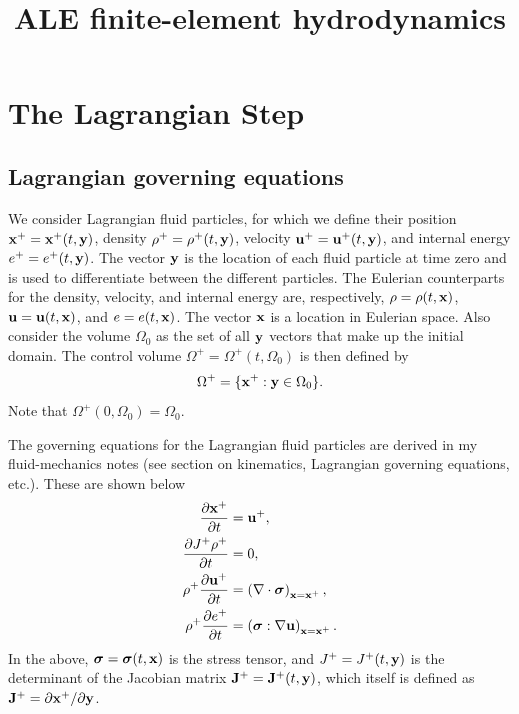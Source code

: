 \documentclass[11pt]{report}
\title{ALE finite-element hydrodynamics}
\begin{document}
\maketitle

\chapter{The Lagrangian Step}
\section{Lagrangian governing equations}
We consider Lagrangian fluid particles, for which we define their position $\mathbf{x}^+=\mathbf{x}^+(t,\mathbf{y})$, density $\rho^+ = \rho^+(t,\mathbf{y})$, velocity $\mathbf{u}^+ = \mathbf{u}^+(t,\mathbf{y})$, and internal energy $e^+ = e^+(t,\mathbf{y})$. The vector $\mathbf{y}$ is the location of each fluid particle at time zero and is used to differentiate between the different particles. The Eulerian counterparts for the density, velocity, and internal energy are, respectively, $\rho = \rho(t,\mathbf{x})$, $\mathbf{u} = \mathbf{u}(t,\mathbf{x})$, and $e = e(t,\mathbf{x})$. The vector $\mathbf{x}$ is a location in Eulerian space. Also consider the volume $\Omega_0$ as the set of all $\mathbf{y}$ vectors that make up the initial domain. The control volume $\Omega^+ = \Omega^+(t, \Omega_0)$ is then defined by
\begin{equation}
    \Omega^+ = \{ \mathbf{x}^+:\mathbf{y} \in \Omega_0 \}.
\end{equation}
Note that $\Omega^+(0,\Omega_0) = \Omega_0$.

The governing equations for the Lagrangian fluid particles are derived in my fluid-mechanics notes (see section on kinematics, Lagrangian governing equations, etc.). These are shown below
\begin{align}
    \frac{\partial \mathbf{x}^+}{\partial t} &= \mathbf{u}^+, \label{eq:lag_gov_evol_x} \\
    \frac{\partial J^+ \rho^+}{\partial t} &= 0, \label{eq:lag_gov_evol_rho} \\
    \rho^+ \frac{\partial \mathbf{u}^+}{\partial t} &= \left ( \nabla \cdot \bm \sigma \right )_{\mathbf{x} = \mathbf{x}^+}, \label{eq:lag_gov_evol_u} \\
    \rho^+ \frac{\partial e^+}{\partial t} &= \left ( \bm \sigma : \nabla \mathbf{u} \right )_{\mathbf{x} = \mathbf{x}^+}. \label{eq:lag_gov_evol_e}
\end{align}
In the above, $\bm \sigma = \bm \sigma(t,\mathbf{x})$ is the stress tensor, and $J^+ = J^+(t,\mathbf{y})$ is the determinant of the Jacobian matrix $\mathbf{J}^+ = \mathbf{J}^+(t,\mathbf{y})$, which itself is defined as $\mathbf{J}^+ =  \partial \mathbf{x}^+ / \partial \mathbf{y}$. 
\end{document}

